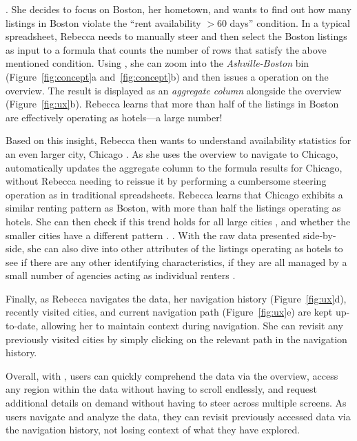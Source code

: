 .
She decides to focus on Boston, her hometown,
and wants to find out how many listings
in Boston violate
the ``rent availability $>60$ days'' condition.
In a typical spreadsheet, Rebecca needs to manually steer and then select
the Boston listings as input to a  formula that counts the number of
rows that satisfy the above mentioned condition.
Using \noah, she can zoom into
the {\em Ashville-Boston} bin
(Figure~\ref{fig:concept}a and~\ref{fig:concept}b)
and then issues
a  operation on the overview.
The result is displayed as an {\em aggregate column}
alongside the overview (Figure~\ref{fig:ux}b).
Rebecca learns  that more than half of the listings in Boston are 
effectively operating as hotels---a large number! 

Based on this insight, Rebecca then wants to
understand availability statistics for an even
larger city, Chicago .
As she uses the overview to navigate
to Chicago, \noah
automatically updates the aggregate column to
the  formula results for Chicago,
without Rebecca needing to reissue it by performing a cumbersome steering operation as in traditional spreadsheets. 
Rebecca learns that Chicago exhibits 
a similar renting pattern as Boston, with more than half the listings operating as hotels. She can then check if this trend holds for all large cities ,
and whether the smaller cities have a different pattern . . With the raw 
data presented side-by-side, she can also dive into other attributes
of the listings operating as hotels to see if there are any other identifying characteristics,
\eg if they are all managed by a small number of agencies acting as individual renters .

 Finally, as Rebecca navigates the data,
 her navigation history (Figure~\ref{fig:ux}d),
 \ie recently visited cities, and current navigation path
 (Figure~\ref{fig:ux}e) are kept up-to-date,
 allowing her to maintain context during navigation.
 She can revisit any previously visited cities
 by simply clicking on the relevant path
 in the navigation history.


Overall, with \noah, users can quickly
comprehend the data via the overview, access any region 
within the data without having to
scroll endlessly, and request additional details on demand without having to
steer across multiple screens. As users navigate and analyze the data, 
they can revisit previously accessed data via the navigation history, not losing context
of what they have explored. 





